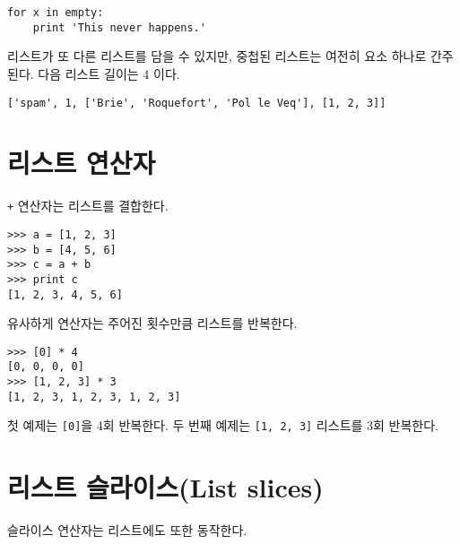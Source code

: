 \beforeverb
\begin{verbatim}
for x in empty:
    print 'This never happens.'
\end{verbatim}
\afterverb
%

리스트가 또 다른 리스트를 담을 수 있지만, 중첩된 리스트는 여전히 요소 하나로 간주된다. 
다음 리스트 길이는 4 이다.


\beforeverb
\begin{verbatim}
['spam', 1, ['Brie', 'Roquefort', 'Pol le Veq'], [1, 2, 3]]
\end{verbatim}
\afterverb

\section{리스트 연산자}

{\tt +} 연산자는 리스트를 결합한다.


\beforeverb
\begin{verbatim}
>>> a = [1, 2, 3]
>>> b = [4, 5, 6]
>>> c = a + b
>>> print c
[1, 2, 3, 4, 5, 6]
\end{verbatim}
\afterverb
%

유사하게 {\tt *} 연산자는 주어진 횟수만큼 리스트를 반복한다.


\beforeverb
\begin{verbatim}
>>> [0] * 4
[0, 0, 0, 0]
>>> [1, 2, 3] * 3
[1, 2, 3, 1, 2, 3, 1, 2, 3]
\end{verbatim}
\afterverb
%

첫 예제는 {\tt [0]}을 4회 반복한다. 
두 번째 예제는 {\tt [1, 2, 3]} 리스트를 3회 반복한다.

\section{리스트 슬라이스(List slices)}


슬라이스 연산자는 리스트에도 또한 동작한다.

